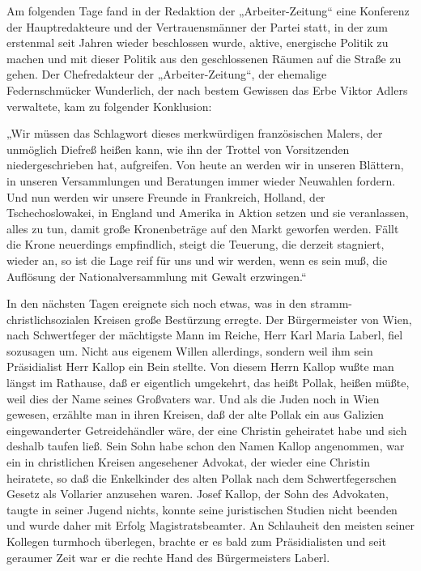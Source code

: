 Am folgenden Tage fand in der Redaktion der „Arbeiter-Zeitung“ eine
Konferenz der Hauptredakteure und der Vertrauensmänner der Partei
statt, in der zum erstenmal seit Jahren wieder beschlossen wurde,
aktive, energische Politik zu machen und mit dieser Politik aus den
geschlossenen Räumen auf die Straße zu gehen. Der Chefredakteur der
„Arbeiter-Zeitung“, der ehemalige Federnschmücker Wunderlich, der
nach bestem Gewissen das Erbe Viktor Adlers verwaltete, kam zu
folgender Konklusion:

„Wir müssen das Schlagwort dieses merkwürdigen französischen
Malers, der unmöglich Diefreß heißen kann, wie ihn der Trottel von
Vorsitzenden niedergeschrieben hat, aufgreifen. Von heute an werden
wir in unseren Blättern, in unseren Versammlungen und Beratungen
immer wieder Neuwahlen fordern. Und nun werden wir unsere Freunde
in Frankreich, Holland, der Tschechoslowakei, in England und
Amerika in Aktion setzen und sie veranlassen, alles zu tun, damit
große Kronenbeträge auf den Markt geworfen werden. Fällt die Krone
neuerdings empfindlich, steigt die Teuerung, die derzeit stagniert,
wieder an, so ist die Lage reif für uns und wir werden, wenn es
sein muß, die Auflösung der Nationalversammlung mit Gewalt
erzwingen.“

\tb{* * *}
In den nächsten Tagen ereignete sich noch etwas,
was in den stramm-christlichsozialen Kreisen große Bestürzung
erregte. Der Bürgermeister von Wien, nach Schwertfeger der
mächtigste Mann im Reiche, Herr Karl Maria Laberl, fiel sozusagen
um. Nicht aus eigenem Willen allerdings, sondern weil ihm sein
Präsidialist Herr Kallop ein Bein stellte. Von diesem Herrn Kallop
wußte man längst im Rathause, daß er eigentlich umgekehrt, das
heißt Pollak, heißen müßte, weil dies der Name seines Großvaters
war. Und als die Juden noch in Wien gewesen, erzählte man in ihren
Kreisen, daß der alte Pollak ein aus Galizien eingewanderter
Getreidehändler wäre, der eine Christin geheiratet habe und sich
deshalb taufen ließ. Sein Sohn habe schon den Namen Kallop
angenommen, war ein in christlichen Kreisen angesehener Advokat,
der wieder eine Christin heiratete, so daß die Enkelkinder des
alten Pollak nach dem Schwertfegerschen Gesetz als Vollarier
anzusehen waren. Josef Kallop, der Sohn des Advokaten, taugte in
seiner Jugend nichts, konnte seine juristischen Studien nicht
beenden und wurde daher mit Erfolg Magistratsbeamter. An Schlauheit
den meisten seiner Kollegen turmhoch überlegen, brachte er es bald
zum Präsidialisten und seit geraumer Zeit war er die rechte Hand
des Bürgermeisters Laberl.


